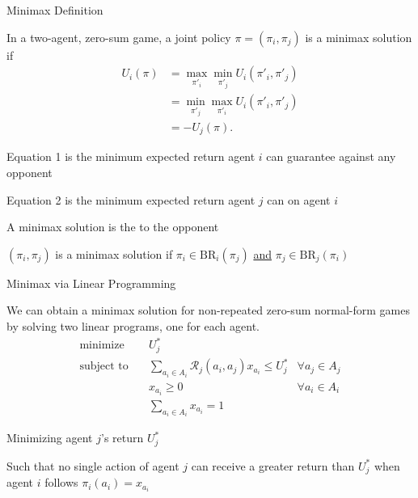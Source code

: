 \begin{frame}{Minimax Definition}

    In a two-agent, zero-sum game, a joint policy \(\pi = (\pi_i, \pi_j)\) is a minimax solution if
    \vspace{2pt}
    \begin{align}
        U_i(\pi) &= \max_{\pi'_i} \min_{\pi'_j} U_i(\pi'_i, \pi'_j) \\
        &= \min_{\pi'_j} \max_{\pi'_i} U_i(\pi'_i, \pi'_j) \\
        &= -U_j(\pi).
    \end{align}

    \blist
        \item Equation 1 is the minimum expected return agent \(i\) can guarantee against any opponent
        \item Equation 2 is the minimum expected return agent \(j\) can  on agent \(i\)
        \item A minimax solution is the  to the  opponent
        \item \((\pi_i, \pi_j)\) is a minimax solution if \(\pi_i \in \text{BR}_i(\pi_j)\) \underline{and} \(\pi_j \in \text{BR}_j(\pi_i)\)
    \elist
      
\end{frame}

\begin{frame}{Minimax via Linear Programming}

We can obtain a minimax solution for non-repeated zero-sum normal-form games by solving two linear programs, one for each agent.
    \vspace{0pt}
    \begin{align*}
    \text{minimize} \quad & U^*_j \\
    \text{subject to} \quad & \sum_{a_i \in A_i} \mathcal{R}_j(a_i, a_j) x_{a_i} \leq U^*_j & \forall a_j \in A_j \\
    & x_{a_i} \geq 0 & \forall a_i \in A_i \\
    & \sum_{a_i \in A_i} x_{a_i} = 1
    \end{align*}

    \blist
        \item Minimizing agent \(j\)'s return \(U^*_j\)
        \item Such that no single action of agent \(j\) can receive a greater return than \(U^*_j\) when agent \(i\) follows \(\pi_i(a_i) = x_{a_i}\)
    \elist
\end{frame}

